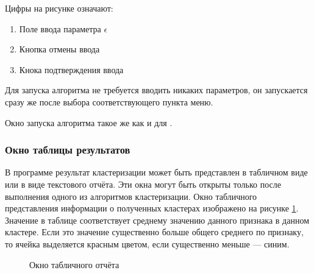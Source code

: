 \documentclass[12pt,tikz]{instruction}
\begin{document}
Цифры на рисунке означают:
\begin{enumerate}
	\item Поле ввода параметра $ \epsilon $
	\item Кнопка отмены ввода
	\item Кнока подтверждения ввода
\end{enumerate}

\textbf{\dePDDP}

Для запуска алгоритма \dePDDP не требуется вводить никаких параметров, он запускается сразу же после выбора соответствующего пункта меню.

\textbf{\IKmeans}

Окно запуска алгоритма \IKmeans такое же как и для \AWard.


\subsubsection{Окно таблицы результатов}
В программе результат кластеризации может быть представлен в табличном виде или в виде текстового отчёта.  Эти окна могут быть открыты только после выполнения одного из алгоритмов кластеризации. Окно табличного представления информации о полученных кластерах изображено на рисунке \ref{fig:table-report}. Значение в таблице соответствует среднему значению данного признака в данном кластере. Если это значение существенно больше общего среднего по признаку, то ячейка выделяется красным цветом, если существенно меньше --- синим.

\begin{figure}[H]
	\centering
	\caption{Окно табличного отчёта}
	\label{fig:table-report}
\end{figure}
\end{document}
